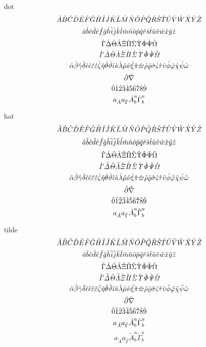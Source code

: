 \documentclass{article}
\begin{document}
dot
\[ \Ad \Bd \Cd \Dd \Ed \Fd \Gd \Hd \Idot \Jd \Kd \Ld \Md \Nd \Od \Pd \Qd \Rd \Sd \Td \Ud \Vd \Wd \Xd \Yd \Zd \]
\[ \aad \bbd \ccd \ddd \eed \ffd \ggd \hhd \iid \jjd \kkd \lld \mmd \nnd \ood \ppd \qqd \rrd \ssd \ttd \uud \vvd \wwd \xxd \yyd \zzd \]
\[ \Gammad \Deltad \Thetad \Lambdad \Xid \Pid \Sigmad \Upsilond \Phid \Psid \Omegad \]
\[ \itGammad \itDeltad \itThetad \itLambdad \itXid \itPid \itSigmad \itUpsilond \itPhid \itPsid \itOmegad \]
\[ \alphad \betad \gammad \deltad \epsilond \epsd \varepsilond \vepsd \zetad \etad \thetad \varthetad \iotad \kappad \lambdad \mud \nud \xid \pid \varpid \rhod \varrhod \sigmad \varsigmad \taud \upsilond \phid \varphid \chid \psid \omegad \]
\[ \partiald \nablad \]
\[ \zrod \oned \twod \thrd \ford \fivd \sixd \sevd \eitd \nind \]
\[ a_\Ad a_\Gammad \Ad^a_b \Gammad^a_b \]

hat
\[ \Ah \Bh \Ch \Dh \Eh \Fh \Gh \Hh \Ih \Jh \Kh \Lh \Mh \Nh \Oh \Ph \Qh \Rh \Sh \Th \Uh \Vh \Wh \Xh \Yh \Zh \]
\[ \aah \bbh \cch \ddh \eeh \ffh \ggh \hhh \iih \jjh \kkh \llh \mmh \nnh \ooh \pph \qqh \rrh \ssh \tth \uuh \vvh \wwh \xxh \yyh \zzh \]
\[ \Gammah \Deltah \Thetah \Lambdah \Xih \Pih \Sigmah \Upsilonh \Phih \Psih \Omegah \]
\[ \itGammah \itDeltah \itThetah \itLambdah \itXih \itPih \itSigmah \itUpsilonh \itPhih \itPsih \itOmegah \]
\[ \alphah \betah \gammah \deltah \epsilonh \epsh \varepsilonh \vepsh \zetah \etah \thetah \varthetah \iotah \kappah \lambdah \muh \nuh \xih \pih \varpih \rhoh \varrhoh \sigmah \varsigmah \tauh \upsilonh \phih \varphih \chih \psih \omegah \]
\[ \partialh \nablah \]
\[ \zroh \oneh \twoh \thrh \forh \fivh \sixh \sevh \eith \ninh \]
\[ a_\Ah a_\Gammah \Ah^a_b \Gammah^a_b \]

tilde
\[ \At \Bt \Ct \Dt \Et \Ft \Gt \Ht \It \Jt \Kt \Lt \Mt \Nt \Ot \Pt \Qt \Rt \St \Tt \Ut \Vt \Wt \Xt \Yt \Zt \]
\[ \aat \bbt \cct \ddt \eet \fft \ggt \hht \iit \jjt \kkt \llt \mmt \nnt \oot \ppt \qqt \rrt \sst \ttt \uut \vvt \wwt \xxt \yyt \zzt \]
\[ \Gammat \Deltat \Thetat \Lambdat \Xit \Pit \Sigmat \Upsilont \Phit \Psit \Omegat \]
\[ \itGammat \itDeltat \itThetat \itLambdat \itXit \itPit \itSigmat \itUpsilont \itPhit \itPsit \itOmegat \]
\[ \alphat \betat \gammat \deltat \epsilont \epst \varepsilont \vepst \zetat \etat \thetat \varthetat \iotat \kappat \lambdat \mut \nut \xit \pit \varpit \rhot \varrhot \sigmat \varsigmat \taut \upsilont \phit \varphit \chit \psit \omegat \]
\[ \partialt \nablat \]
\[ \zrot \onet \twot \thrt \fort \fivt \sixt \sevt \eitt \nint \]
\[ a_\At a_\Gammat \At^a_b \Gammat^a_b \]
\[ a_{\tilde A} a_{\tilde \Gamma} \tilde{A}^a_b \tilde{\Gamma}^a_b \]
\end{document}
